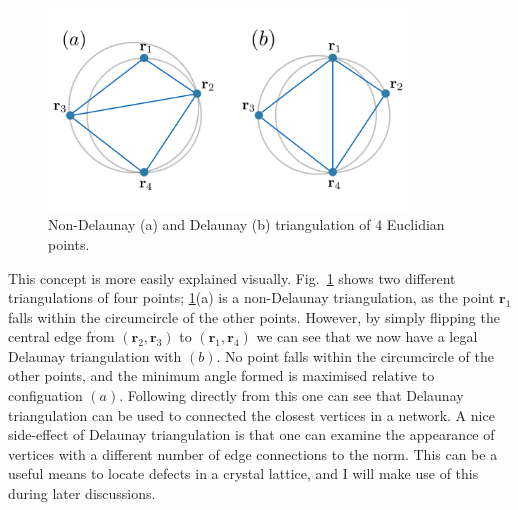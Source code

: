 \begin{figure}\centering
    \includegraphics[width=0.85\textwidth]{Images/ch6_phasegineer/imgs/delaun}
    \caption{Non-Delaunay (a) and Delaunay (b) triangulation of 4 Euclidian points.}\label{fig:delaun}
\end{figure}
This concept is more easily explained visually. Fig.~\ref{fig:delaun} shows two different triangulations of four points;  \ref{fig:delaun}(a) is a non-Delaunay triangulation, as the point $\mathbf{r}_1$ falls within the circumcircle of the other points. However, by simply flipping the central edge from $(\mathbf{r}_2, \mathbf{r}_3)$ to $(\mathbf{r}_1, \mathbf{r}_4)$ we can see that we now have a legal Delaunay triangulation with $(b)$. No point falls within the circumcircle of the other points, and the minimum angle formed is maximised relative to configuation $(a)$. Following directly from this one can see that Delaunay triangulation can be used to connected the closest vertices in a network. A nice side-effect of Delaunay triangulation is that one can examine the appearance of vertices with a different number of edge connections to the norm. This can be a useful means to locate defects in a crystal lattice, and I will make use of this during later discussions.

